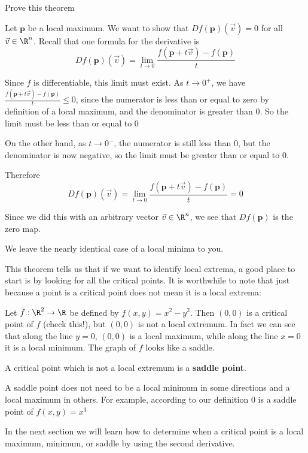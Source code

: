 \documentclass{ximera}
\begin{document}
	Prove this theorem
	\begin{free-response}
		Let $\mathbf{p}$ be a local maximum.  We want to show that $Df(\mathbf{p})(\vec{v}) = 0$ for all $\vec{v} \in \R^n$.  Recall that one formula for the derivative is
		\[
		Df(\mathbf{p})(\vec{v}) = \displaystyle\lim_{t \to 0} \frac{f(\mathbf{p}+t\vec{v}) - f(\mathbf{p})}{t}
		\]
		
		Since $f$ is differentiable, this limit must exist.  As $t \to 0^+$, we have $\frac{f(\mathbf{p}+t\vec{v}) - f(\mathbf{p})}{t} \leq 0$, since the numerator is less than or
		equal to zero by definition of a local maximum, and the denominator is greater than $0$.  So the limit must be less than or equal to $0$
		
		On the other hand, as $t \to 0^-$, the numerator is still less than $0$, but the denominator is now negative, so the limit must be greater than or equal to $0$.
		
		Therefore 
		\[
		Df(\mathbf{p})(\vec{v}) = \displaystyle\lim_{t \to 0} \frac{f(\mathbf{p}+t\vec{v}) - f(\mathbf{p})}{t} = 0
		\]
		
		Since we did this with an arbitrary vector $\vec{v} \in \R^n$, we see that $Df(\mathbf{p})$ is the zero map.
		
		We leave the nearly identical case of a local minima to you.
	\end{free-response}
	
	
	This theorem tells us that if we want to identify local extrema, a good place to start is by looking for all the critical points.  It is worthwhile to note
	that just because a point is a critical point does not mean it is a local extrema:
	
	\begin{example}
		Let $f:\R^2 \to \R$ be defined by $f(x,y) = x^2-y^2$.  Then $(0,0)$ is a critical point of $f$ (check this!), but $(0,0)$ is not a local extremum.  In fact we can see
		that along the line $y=0$, $(0,0)$ is a local maximum, while along the line $x=0$ it is a local minimum.  The graph of $f$ looks like a saddle. 
	\end{example}
	
	\begin{definition}
		A critical point which is not a local extremum is a \textbf{saddle point}.
	\end{definition}
	
	\begin{warning}
		A saddle point does not need to be a local minimum in some directions and a local maximum in others.  For example, according to our definition
		$0$ is a saddle point of $f(x,y)  = x^3$
	\end{warning}
	
	In the next section we will learn how to determine when a critical point is a local maximum, minimum, or saddle by using the second derivative.
	
\end{document}
